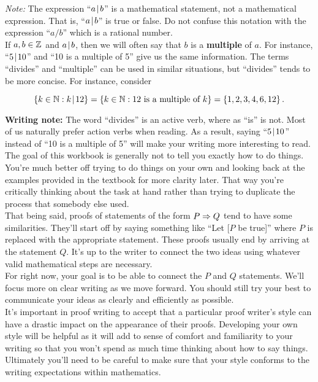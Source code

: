 \noindent \textit{Note:} The expression ``$a \! \mid \! b$'' is a mathematical statement, not a mathematical expression.  That is, ``$a \! \mid \! b$'' is true or false.  Do not confuse this notation with the expression ``$a/b$'' which is a rational number.\\

\noindent  If $a,b \in \mathbb{Z}$ and $a \! \mid \! b$, then we will often say that $b$ is a \textbf{multiple} of $a$.  For instance, ``$5 \! \mid \! 10$'' and ``10 is a multiple of 5'' give us the same information.  The terms ``divides'' and ``multiple'' can be used in similar situations, but ``divides'' tends to be more concise.  For instance, consider

\[\left\{k \in \mathbb{N} : k \! \mid \! 12\right\} = \left\{k \in \mathbb{N} : 12 \ \text{is a multiple of }k\right\} = \left\{1,2,3,4,6,12\right\}.\]

\noindent \textbf{Writing note:}  The word ``divides'' is an active verb, where as ``is'' is not.  Most of us naturally prefer action verbs when reading.  As a result, saying ``$5 \! \mid \! 10$'' instead of ``10 is a multiple of 5'' will make your writing more interesting to read.\\

The goal of this workbook is generally not to tell you exactly how to do things.  You're much better off trying to do things on your own and looking back at the examples provided in the textbook for more clarity later.  That way you're critically thinking about the task at hand rather than trying to duplicate the process that somebody else used.\\

That being said, proofs of statements of the form $P \Rightarrow Q$ tend to have some similarities.  They'll start off by saying something like ``Let [$P$ be true]'' where $P$ is replaced with the appropriate statement.  These proofs usually end by arriving at the statement $Q$.  It's up to the writer to connect the two ideas using whatever valid mathematical steps are necessary.\\

For right now, your goal is to be able to connect the $P$ and $Q$ statements.  We'll focus more on clear writing as we move forward.  You should still try your best to communicate your ideas as clearly and efficiently as possible.\\

It's important in proof writing to accept that a particular proof writer's style can have a drastic impact on the appearance of their proofs.  Developing your own style will be helpful as it will add to sense of comfort and familiarity to your writing so that you won't spend as much time thinking about how to say things.  Ultimately you'll need to be careful to make sure that your style conforms to the writing expectations within mathematics.

